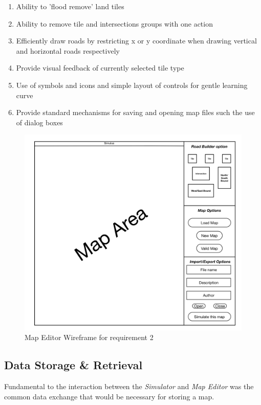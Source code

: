 \begin{enumerate}
\begin{enumerate}[label*=\arabic*.]
	\item Ability to 'flood remove' land tiles
	\item Ability to remove tile and intersections groups with one action
	\item Efficiently draw roads by restricting x or y coordinate when drawing vertical and horizontal roads respectively
	\item Provide visual feedback of currently selected tile type
	\item Use of symbols and icons and simple layout of controls for gentle learning curve
	\item Provide standard mechanisms for saving and opening map files such the use of dialog boxes
  \end{enumerate}
\end{enumerate}

\begin{figure}[h]
	\begin{center}
		\includegraphics{img/Map_Editor_Wireframe.png}
		\caption{Map Editor Wireframe for requirement 2}
		\label{fig:editorwireframe}
	\end{center}
\end{figure}
\pagebreak

\subsection{Data Storage \& Retrieval}\label{ss:xml}
Fundamental to the interaction between the \textit{Simulator} and \textit{Map Editor} was the common data exchange that would be necessary for storing a map.

